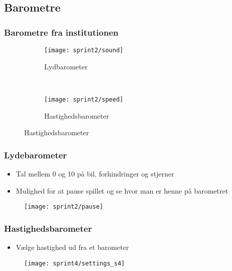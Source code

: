 \subsection{Barometre}
\begin{frame}
\frametitle{Barometre fra institutionen}
\begin{figure}[h]
	\centering
        \begin{subfigure}[b]{0.4\textwidth}
                \texttt{[image: sprint2/sound]}
                \caption{Lydbarometer}
        \end{subfigure}%
        ~
        \begin{subfigure}[b]{0.4\textwidth}
                \texttt{[image: sprint2/speed]}
                \caption{Hastighedsbarometer}
        \end{subfigure}
\end{figure}
\end{frame}

\begin{frame}
\frametitle{Lydebarometer}
\begin{itemize}
\item Tal mellem 0 og 10 på bil, forhindringer og stjerner
\item Mulighed for at pause spillet og se hvor man er henne på barometret
\end{itemize}
\begin{figure}
\texttt{[image: sprint2/pause]}
\end{figure}
\end{frame}

\begin{frame}
\frametitle{Hastighedsbarometer}
\begin{itemize}
\item Vælge hastighed ud fra et barometer
\end{itemize}
\begin{figure}
\texttt{[image: sprint4/settings\_s4]}
\end{figure}
\end{frame}